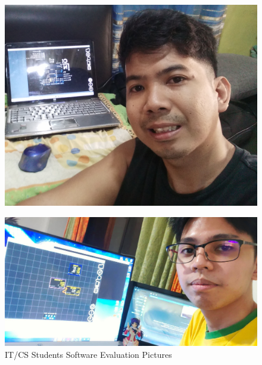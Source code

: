 \begin{figure}[H]
	 \centering
	 \includegraphics[width=\textwidth]{evaluators/non_tech/f_mr.jpg}
\end{figure}
\begin{figure}[H]
	 \centering
	 \includegraphics[width=\textwidth]{evaluators/non_tech/f_ip.jpg}
	 \caption[]{IT/CS Students Software Evaluation Pictures}
\end{figure}
